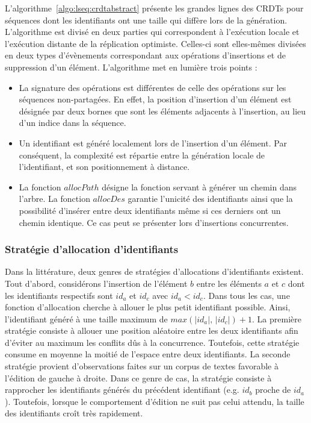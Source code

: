 L'algorithme~\ref{algo:lseq:crdtabstract} présente les grandes lignes des CRDTs pour
séquences dont les identifiants ont une taille qui diffère lors de la
génération. L'algorithme est divisé en deux parties qui correspondent à
l'exécution locale et l'exécution distante de la réplication
optimiste. Celles-ci sont elles-mêmes divisées en deux types d'évènements
correspondant aux opérations d'insertions et de suppression d'un
élément. L'algorithme met en lumière trois points :
\begin{itemize}
\item La signature des opérations est différentes de celle des opérations sur
  les séquences non-partagées. En effet, la position d'insertion d'un élément est
  désignée par deux bornes que sont les éléments adjacents à l'insertion, au lieu
  d'un indice dans la séquence.
\item Un identifiant est généré localement lors de l'insertion d'un élément. Par
  conséquent, la complexité est répartie entre la génération locale de
  l'identifiant, et son positionnement à distance.
\item La fonction $allocPath$ désigne la fonction servant à générer un chemin
  dans l'arbre. La fonction $allocDes$ garantie l'unicité des identifiants ainsi
  que la possibilité d'insérer entre deux identifiants même si ces derniers ont
  un chemin identique.  Ce cas peut se présenter lors d'insertions concurrentes.
\end{itemize}


\subsubsection{Stratégie d'allocation d'identifiants}

Dans la littérature, deux genres de stratégies d'allocations d'identifiants
existent. Tout d'abord, considérons l'insertion de l'élément $b$ entre les
éléments $a$ et $c$ dont les identifiants respectifs sont $id_a$ et $id_c$ avec
$id_a<id_c$. Dans tous les cas, une fonction d'allocation cherche à allouer le
plus petit identifiant possible. Ainsi, l'identifiant généré à une taille
maximum de $max(|id_a|,\, |id_c|)+1$. La première stratégie consiste à allouer
une position aléatoire entre les deux identifiants afin d'éviter au maximum les
conflits dûs à la concurrence. Toutefois, cette stratégie consume en moyenne la
moitié de l'espace entre deux identifiants. La seconde stratégie provient
d'observations faites sur un corpus de textes favorable à l'édition de gauche à
droite. Dans ce genre de cas, la stratégie consiste à rapprocher les
identifiants générés du précédent identifiant (e.g. $id_b$ proche de
$id_a$). Toutefois, lorsque le comportement d'édition ne suit pas celui attendu,
la taille des identifiants croît très rapidement.

